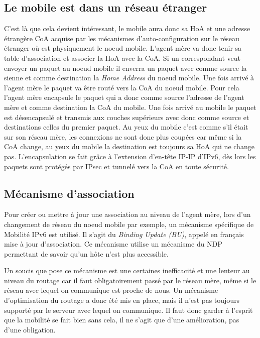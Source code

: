
\subsection{Le mobile est dans un réseau étranger}

C’est là que cela devient intéressant, le mobile aura donc sa HoA et une adresse étrangère CoA acquise par les mécanismes d’auto-configuration sur le réseau étranger où est physiquement le noeud mobile.
L’agent mère va donc tenir sa table d’association et associer la HoA avec la CoA.
Si un correspondant veut envoyer un paquet au noeud mobile il enverra un paquet avec comme source la sienne et comme destination la \emph{Home Address} du noeud mobile.
Une fois arrivé à l’agent mère le paquet va être routé vers la CoA du noeud mobile.
Pour cela l’agent mère encapsule le paquet qui a donc comme source l’adresse de l’agent mère et comme destination la CoA du mobile.
Une fois arrivé au mobile le paquet est désencapsulé et transmis aux couches supérieurs avec donc comme source et destinations celles du premier paquet.
Au yeux du mobile c’est comme s’il était sur son réseau mère, les connexions ne sont donc plus coupées car même si la CoA change, au yeux du mobile la destination est toujours sa HoA qui ne change pas.
L’encapsulation se fait grâce à l’extension d’en-tête IP-IP d’IPv6, dès lors les paquets sont protégés par IPsec et tunnelé vers la CoA en toute sécurité.


\subsection{Mécanisme d’association}

Pour créer ou mettre à jour une association au niveau de l’agent mère, lors d’un changement de réseau du noeud mobile par exemple, un mécanisme spécifique de Mobilité IPv6 est utilisé.
Il s’agit du \emph{Binding Update (BU)}, appelé en français mise à jour d’association.
Ce mécanisme utilise un mécanisme du NDP permettant de savoir qu’un hôte n’est plus accessible.


Un soucis que pose ce mécanisme est une certaines inefficacité et une lenteur au niveau du routage car il faut obligatoirement passé par le réseau mère, même si le réseau avec lequel on communique est proche de nous.
Un mécanisme d’optimisation du routage a donc été mis en place, mais il n’est pas toujours supporté par le serveur avec lequel on communique.
Il faut donc garder à l’esprit que la mobilité se fait bien sans cela, il ne s’agit que d’une amélioration, pas d’une obligation.

